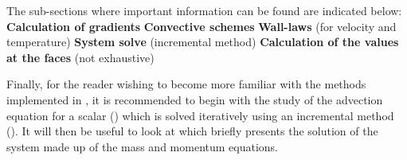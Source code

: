 The sub-sections where important information can be found are indicated
below:\newline
\newline
\nl \newline
\textbf{Calculation of gradients}\newline
\hspace*{1cm}\newline
\textbf{Convective schemes}\newline
\hspace*{1cm}\newline
\hspace*{1cm}\newline
\textbf{Wall-laws} (for velocity and temperature)\newline
\hspace*{1cm}\newline
\hspace*{1cm}\newline
\textbf{System solve} (incremental method)\newline
\hspace*{1cm}\newline
\textbf{Calculation of the values at the faces} (not exhaustive)\newline
\hspace*{1cm}\newline

Finally, for the reader wishing to become more familiar with the methods
implemented in \CS, it is recommended to begin with the study of the
advection equation for a scalar () which is solved iteratively
using an incremental method (). It will then be useful to look
at  which briefly presents the solution of the system made up
of the mass and momentum equations.

